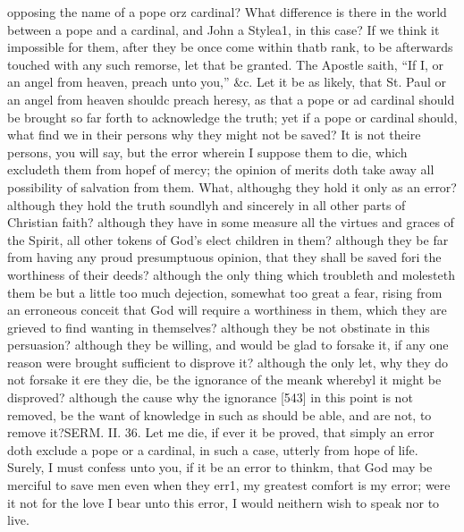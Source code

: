 opposing the name of a pope orz cardinal? What difference is there in the world between a pope and a cardinal, and John a Stylea1, in this case? If we think it impossible for them, after they be once come within thatb rank, to be afterwards touched with any such remorse, let that be granted. The Apostle saith, “If I, or an angel from heaven, preach unto you,” &c. Let it be as likely, that St. Paul or an angel from heaven shouldc preach heresy, as that a pope or ad cardinal should be brought so far forth to acknowledge the truth; yet if a pope or cardinal should, what find we in their persons why they might not be saved? It is not theire persons, you will say, but the error wherein I suppose them to die, which excludeth them from hopef of mercy; the opinion of merits doth take away all possibility of salvation from them. What, althoughg they hold it only as an error? although they hold the truth soundlyh and sincerely in all other parts of Christian faith? although they have in some measure all the virtues and graces of the Spirit, all other tokens of God’s elect children in them? although they be far from having any proud presumptuous opinion, that they shall be saved fori the worthiness of their deeds? although the only thing which troubleth and molesteth them be but a little too much dejection, somewhat too great a fear, rising from an erroneous conceit that God will require a worthiness in them, which they are grieved to find wanting in themselves? although they be not obstinate in this persuasion? although they be willing, and would be glad to forsake it, if any one reason were brought sufficient to disprove it? although the only let, why they do not forsake it ere they die, be the ignorance of the meank wherebyl it might be disproved? although the cause why the ignorance [543] in this point is not removed, be the want of knowledge in such as should be able, and are not, to remove it?SERM. II. 36. Let me die, if ever it be proved, that simply an error doth exclude a pope or a cardinal, in such a case, utterly from hope of life. Surely, I must confess unto you, if it be an error to thinkm, that God may be merciful to save men even when they err1, my greatest comfort is my error; were it not for the love I bear unto this error, I would neithern wish to speak nor to live.

